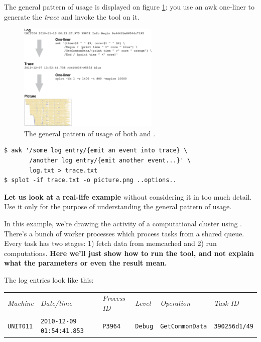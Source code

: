 \documentclass{article}
\begin{document}
The general pattern of usage is displayed on figure \ref{fig:general-usage}: you use an awk one-liner to generate the \emph{trace} and invoke the tool on it.

\begin{figure}[t]
\center
\includegraphics[width=0.6\textwidth]{general-usage.pdf}
\caption{The general pattern of usage of both \timeplot{} and \splot{}.}
\label{fig:general-usage}
\end{figure}

\begin{verbatim}
$ awk '/some log entry/{emit an event into trace} \
       /another log entry/{emit another event...}' \
       log.txt > trace.txt
$ splot -if trace.txt -o picture.png ..options..
\end{verbatim}

\textbf{Let us look at a real-life example} without considering it in too much detail. Use it only for the purpose of understanding the general pattern of usage.
\pagebreak

In this example, we're drawing the activity of a computational cluster using \splot{}. There's a bunch of worker processes which process tasks from a shared queue. Every task has two stages: 1) fetch data from memcached and 2) run computations. \textbf{Here we'll just show how to run the tool, and not explain what the parameters or even the result mean.}

The log entries look like this:

\begin{tabular}{llllll}
\emph{Machine} & \emph{Date/time} & \emph{Process ID} & \emph{Level} & \emph{Operation} & \emph{Task ID} \\
\footnotesize{\texttt{UNIT011}} & \footnotesize{\texttt{2010-12-09 01:54:41.853}} & \footnotesize{\texttt{P3964}} & \footnotesize{\texttt{Debug}} & \footnotesize{\texttt{GetCommonData}} & \footnotesize{\texttt{390256d1/49}} \\
\end{tabular}
\end{document}
